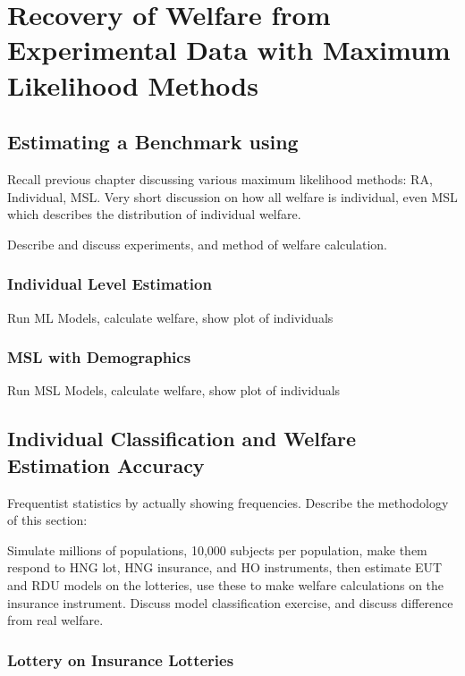 \documentclass[../main.tex]{subfiles}
\begin{document}
\onehalfspacing
\setcounter{chapter}{3}

\chapter{Recovery of Welfare from Experimental Data with Maximum Likelihood Methods}

\lltoc %

\section{Estimating a Benchmark using \texorpdfstring{\textcite{Harrison2016}}{Harrison and Ng (2016)}}
	
	Recall previous chapter discussing various maximum likelihood methods: RA, Individual, MSL.
	Very short discussion on how all welfare is individual, even MSL which describes the distribution of individual welfare.

	Describe and discuss \textcite{Harrison2016} experiments, and method of welfare calculation.

	\subsection{Individual Level Estimation}
		Run ML Models, calculate welfare, show plot of individuals
	\subsection{MSL with Demographics}
		Run MSL Models, calculate welfare, show plot of individuals

\section{Individual Classification and Welfare Estimation Accuracy}
	Frequentist statistics by actually showing frequencies.
	Describe the methodology of this section:

	Simulate millions of populations, 10,000 subjects per population, make them respond to HNG lot, HNG insurance, and HO instruments, then estimate EUT and RDU models on the lotteries, use these to make welfare calculations on the insurance instrument.
	Discuss model classification exercise, and discuss difference from real welfare.

	\subsection{ \texorpdfstring{\textcite{Harrison2016}}{Harrison and Ng (2016)} Lottery on \texorpdfstring{\textcite{Harrison2016}}{Harrison and Ng (2016)} Insurance Lotteries   }
\end{document}
